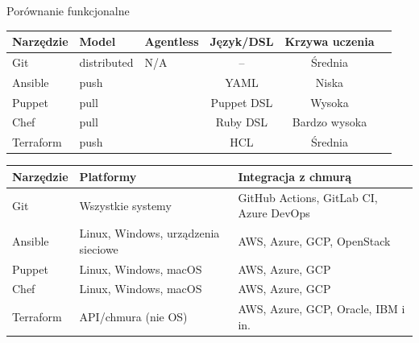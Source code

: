 \documentclass{beamer}
\newcommand{\cmark}{\ding{51}}
\newcommand{\xmark}{\ding{55}}
\begin{document}
\begin{frame}{Por\'ownanie funkcjonalne}
    \begin{center}
        \scriptsize
        \setlength{\tabcolsep}{4pt}
        \begin{tabular}{@{}lllccp{2.4cm}@{}}
            \toprule
            \textbf{Narz\k{e}dzie} & \textbf{Model} & \textbf{Agentless} & \textbf{J\k{e}zyk/DSL} & \textbf{Krzywa uczenia} \\
            \midrule
            Git                    & distributed    & N/A                & --                     & \'{S}rednia             \\
            Ansible                & push           & \cmark             & YAML                   & Niska                   \\
            Puppet                 & pull           & \xmark             & Puppet DSL             & Wysoka                  \\
            Chef                   & pull           & \xmark             & Ruby DSL               & Bardzo wysoka           \\
            Terraform              & push           & \cmark             & HCL                    & \'{S}rednia             \\
            \bottomrule
        \end{tabular}
    \end{center}
    \vspace{0.4em}
    \begin{center}
        \scriptsize
        \setlength{\tabcolsep}{4pt}
        \begin{tabular}{@{}lll@{}}
            \toprule
            \textbf{Narz\k{e}dzie} & \textbf{Platformy}                      & \textbf{Integracja z chmur\k{a}}        \\
            \midrule
            Git                    & Wszystkie systemy                       & GitHub Actions, GitLab CI, Azure DevOps \\
            Ansible                & Linux, Windows, urz\k{a}dzenia sieciowe & AWS, Azure, GCP, OpenStack              \\
            Puppet                 & Linux, Windows, macOS                   & AWS, Azure, GCP                         \\
            Chef                   & Linux, Windows, macOS                   & AWS, Azure, GCP                         \\
            Terraform              & API/chmura (nie OS)                     & AWS, Azure, GCP, Oracle, IBM i in.      \\
            \bottomrule
        \end{tabular}
    \end{center}
\end{frame}
\end{document}
